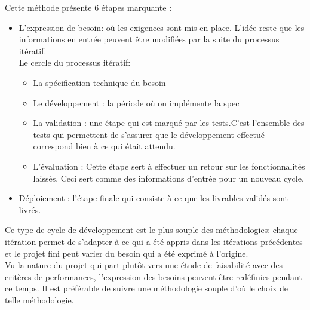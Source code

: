             Cette méthode présente 6 étapes marquante : 
            \begin{itemize}
                \renewcommand{\labelitemi}{$\bullet$}
                \item L’expression de besoin: où les exigences sont mis en place. L’idée reste que 
                les informations en entrée peuvent être modifiées par la suite du processus itératif.\\
                Le cercle du processus itératif: 
                \begin{itemize}
                    \renewcommand{\labelitemi}{$\bullet$}
                    \item  La spécification technique du besoin 
                    \item  Le développement : la période où on implémente la spec
                    \item  La validation : une étape qui est marqué par les tests.C’est l’ensemble des tests qui 
                    permettent de s’assurer que le développement effectué correspond bien à ce qui était attendu.
                    \item  L’évaluation : Cette étape sert à effectuer un retour sur les fonctionnalités laissés. 
                    Ceci sert comme des informations d’entrée pour un nouveau cycle.
                \end{itemize} 
                \item Déploiement : l’étape finale qui consiste à ce que les livrables validés sont livrés.  
            \end{itemize}

             \vspace{0.5cm}
            
            Ce type de cycle de développement est le plus souple des méthodologies:
             chaque itération permet de s’adapter à ce qui a été appris dans les itérations précédentes et 
             le projet fini peut varier du besoin qui a été exprimé à l’origine.\cite{cycle_iteratif} \\
            
            Vu la nature du projet qui part plutôt vers une étude de faisabilité avec des critères de performances, 
            l’expression des besoins peuvent être redéfinies pendant ce temps. Il est préférable de suivre une méthodologie 
            souple d’où le choix de telle méthodologie. 
            


